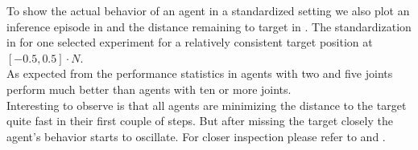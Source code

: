 To show the actual behavior of an agent in a standardized setting we also plot an inference episode in  and the distance remaining to target in . The standardization in  for one selected experiment for a relatively consistent target position at $[-0.5, 0.5] \cdot N$. \\
As expected from the performance statistics in  agents with two and five joints perform much better than agents with ten or more joints. \\
Interesting to observe is that all agents are minimizing the distance to the target quite fast in their first couple of steps. But after missing the target closely the agent's behavior starts to oscillate.
For closer inspection please refer to  and . \\


